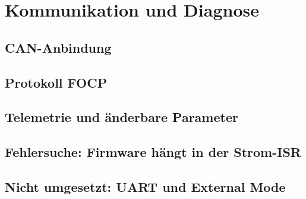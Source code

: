\chapter{Kommunikation und Diagnose}
\label{ch:kommunikation}

\section{CAN-Anbindung}

\section{Protokoll FOCP}

\section{Telemetrie und änderbare Parameter}

\section{Fehlersuche: Firmware hängt in der Strom-ISR}

\section{Nicht umgesetzt: UART und External Mode}
